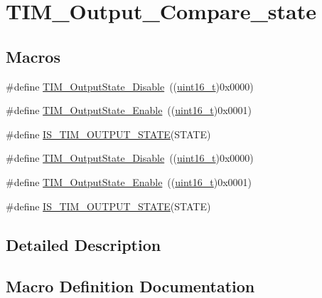 \hypertarget{group___t_i_m___output___compare__state}{}\section{T\+I\+M\+\_\+\+Output\+\_\+\+Compare\+\_\+state}
\label{group___t_i_m___output___compare__state}
\subsection*{Macros}
\begin{DoxyCompactItemize}
\item 
\#define \hyperlink{group___t_i_m___output___compare__state_ga4ad0f484cfa16b5190654da8278940d0}{T\+I\+M\+\_\+\+Output\+State\+\_\+\+Disable}~((\hyperlink{_p_e___types_8h_a1f1825b69244eb3ad2c7165ddc99c956}{uint16\+\_\+t})0x0000)
\item 
\#define \hyperlink{group___t_i_m___output___compare__state_ga65afdda8761b6ac5ed0c0ad67c05dffe}{T\+I\+M\+\_\+\+Output\+State\+\_\+\+Enable}~((\hyperlink{_p_e___types_8h_a1f1825b69244eb3ad2c7165ddc99c956}{uint16\+\_\+t})0x0001)
\item 
\#define \hyperlink{group___t_i_m___output___compare__state_ga5848617f830d2de688eaff50ed279679}{I\+S\+\_\+\+T\+I\+M\+\_\+\+O\+U\+T\+P\+U\+T\+\_\+\+S\+T\+A\+TE}(S\+T\+A\+TE)
\item 
\#define \hyperlink{group___t_i_m___output___compare__state_ga4ad0f484cfa16b5190654da8278940d0}{T\+I\+M\+\_\+\+Output\+State\+\_\+\+Disable}~((\hyperlink{_p_e___types_8h_a1f1825b69244eb3ad2c7165ddc99c956}{uint16\+\_\+t})0x0000)
\item 
\#define \hyperlink{group___t_i_m___output___compare__state_ga65afdda8761b6ac5ed0c0ad67c05dffe}{T\+I\+M\+\_\+\+Output\+State\+\_\+\+Enable}~((\hyperlink{_p_e___types_8h_a1f1825b69244eb3ad2c7165ddc99c956}{uint16\+\_\+t})0x0001)
\item 
\#define \hyperlink{group___t_i_m___output___compare__state_ga5848617f830d2de688eaff50ed279679}{I\+S\+\_\+\+T\+I\+M\+\_\+\+O\+U\+T\+P\+U\+T\+\_\+\+S\+T\+A\+TE}(S\+T\+A\+TE)
\end{DoxyCompactItemize}


\subsection{Detailed Description}


\subsection{Macro Definition Documentation}
